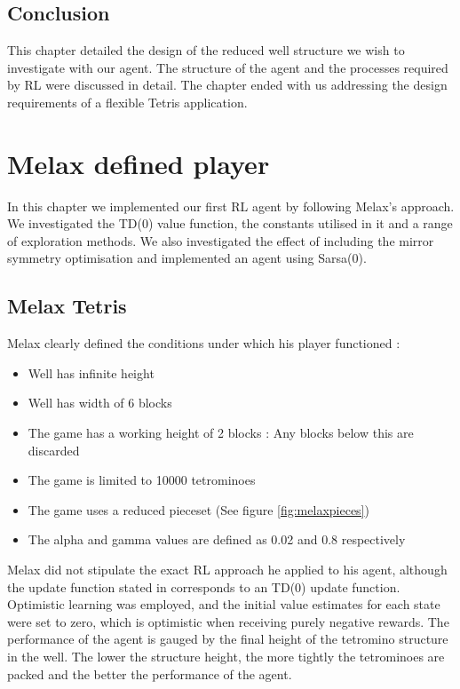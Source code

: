 \documentclass{rucsthesis}
\begin{document}
\section{Conclusion}

This chapter detailed the design of the reduced well structure we wish to investigate with our agent. The structure of the agent and the processes required by RL were discussed in detail. The chapter ended with us addressing the design requirements of a flexible Tetris application. 

\chapter{Melax defined player}

In this chapter we implemented our first RL agent by following Melax's approach. We investigated the TD(0) value function, the constants utilised in it and a range of exploration methods. We also investigated the effect of including the mirror symmetry optimisation and implemented an agent using Sarsa(0).

\section{Melax Tetris \label{melaxchapt}}

Melax clearly defined the conditions under which his player functioned :

\begin{itemize}
\item{Well has infinite height}
\item{Well has width of 6 blocks}
\item{The game has a working height of 2 blocks : Any blocks below this are discarded}
\item{The game is limited to 10000 tetrominoes}
\item{The game uses a reduced pieceset (See figure \ref{fig:melaxpieces})}
\item{The alpha and gamma values are defined as 0.02 and 0.8 respectively}
\end{itemize}

Melax did not stipulate the exact RL approach he applied to his agent, although the update function stated in \cite{melaxtetris} corresponds to an TD(0) update function. Optimistic learning was employed, and the initial value estimates for each state were set to zero, which is optimistic when receiving purely negative rewards. The performance of the agent is gauged by the final height of the tetromino structure in the well. The lower the structure height, the more tightly the tetrominoes are packed and the better the performance of the agent.
\end{document}
